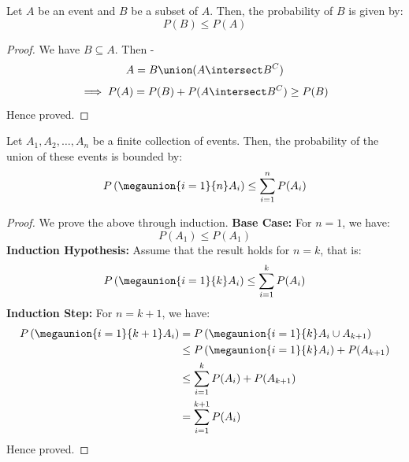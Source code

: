 \documentclass[openany]{book}
\begin{document}
\begin{mytheorem}
Let $A$ be an event and $B$ be a subset of $A$. Then, the probability of $B$ is given by:
$$P(B) \leq P(A)$$
\end{mytheorem}
\begin{proof}
    We have $B \subseteq A$. Then - \\
    $$A = B \union (A \intersect B^C)$$
    $$\implies P(A) = P(B) + P(A \intersect B^C) \geq P(B)$$
    Hence proved.  
\end{proof}

\begin{mytheorem}
    Let $A_1, A_2, \ldots, A_n$ be a finite collection of events. Then, the probability of the union of these events is bounded by:
    $$P\left( \megaunion{i=1}{n}A_i \right) \leq \sum_{i=1}^{n} P(A_i)$$
\end{mytheorem}
\begin{proof}
    We prove the above through induction. 
    \textbf{Base Case:} For $n=1$, we have:
    $$P(A_1) \leq P(A_1)$$
    \textbf{Induction Hypothesis:} Assume that the result holds for $n=k$, that is:
    $$P\left( \megaunion{i=1}{k}A_i \right) \leq \sum_{i=1}^{k} P(A_i)$$
    \textbf{Induction Step:} For $n=k+1$, we have:
    \begin{align*}
    P\left( \megaunion{i=1}{k+1}A_i \right) &= P\left( \megaunion{i=1}{k}A_i \cup A_{k+1} \right) \\
    &\leq P\left( \megaunion{i=1}{k}A_i \right) + P(A_{k+1}) \\
    &\leq \sum_{i=1}^{k} P(A_i) + P(A_{k+1}) \\
    &= \sum_{i=1}^{k+1} P(A_i)
    \end{align*}
    Hence proved. 
\end{proof}
\end{document}
